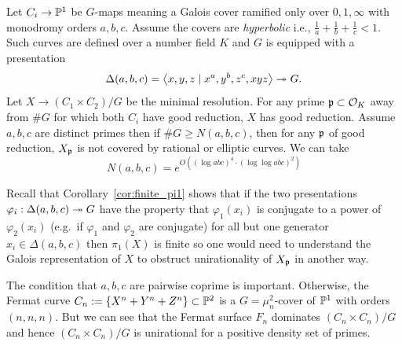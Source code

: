 \documentclass[main.tex]{subfiles}
\begin{document}
\begin{theorem}
Let $C_i \to \P^1$ be $G$-\Belyi maps meaning a Galois cover ramified only over $0,1,\infty$ with monodromy orders $a,b,c$. Assume the covers are \textit{hyperbolic} i.e., $\frac{1}{a} + \frac{1}{b} + \frac{1}{c} < 1$. Such curves are defined over a number field $K$ and $G$ is equipped with a presentation
\[ \Delta(a,b,c) = \left< x,y,z \mid x^a,y^b,z^c, xyz \right> \onto G. \] 
Let $X \to (C_1 \times C_2)/G$ be the minimal resolution. For any prime $\p \subset \cO_K$ away from $\# G$ for which both $C_i$ have good reduction, $X$ has good reduction. Assume $a,b,c$ are distinct primes then if $\# G \ge N(a,b,c)$, then for any $\p$ of good reduction, $X_{\p}$ is not covered by rational or elliptic curves. We can take
\[ N(a,b,c) = e^{O \left( (\log{abc})^4 \cdot (\log\log{abc})^2 \right)} \]
\end{theorem}

\begin{rmk}
Recall that Corollary~\ref{cor:finite_pi1} shows that if the two presentations $\varphi_i : \Delta(a,b,c) \onto G$ have the property that $\varphi_1(x_i)$ is conjugate to a power of $\varphi_2(x_i)$ (e.g.\ if $\varphi_1$ and $\varphi_2$ are conjugate) for all but one generator $x_i \in \Delta(a,b,c)$ then $\pi_1(X)$ is finite so one would need to understand the Galois representation of $X$ to obstruct unirationality of $X_{\p}$ in another way.
\end{rmk}

\begin{rmk}
The condition that $a,b,c$ are pairwise coprime is important. Otherwise, the Fermat curve $C_n := \{ X^n + Y^n + Z^n \} \subset \P^2$ is a $G = \mu_n^2$-\Belyi cover of $\P^1$ with orders $(n,n,n)$. But we can see that the Fermat surface $F_n$ dominates $(C_n \times C_n)/G$ and hence $(C_n \times C_n)/G$ is unirational for a positive density set of primes.
\end{rmk}
\end{document}
